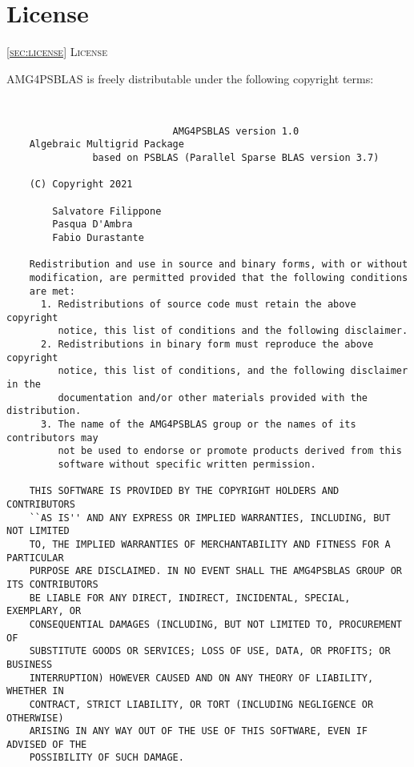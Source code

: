 \section{License\label{sec:license}}
         {\textsc{\ref{sec:license} License}}


AMG4PSBLAS is freely distributable under the following copyright
terms: {\small
\begin{verbatim}
  
   
                             AMG4PSBLAS version 1.0
    Algebraic Multigrid Package
               based on PSBLAS (Parallel Sparse BLAS version 3.7)
    
    (C) Copyright 2021
  
        Salvatore Filippone  
        Pasqua D'Ambra   
        Fabio Durastante        
   
    Redistribution and use in source and binary forms, with or without
    modification, are permitted provided that the following conditions
    are met:
      1. Redistributions of source code must retain the above copyright
         notice, this list of conditions and the following disclaimer.
      2. Redistributions in binary form must reproduce the above copyright
         notice, this list of conditions, and the following disclaimer in the
         documentation and/or other materials provided with the distribution.
      3. The name of the AMG4PSBLAS group or the names of its contributors may
         not be used to endorse or promote products derived from this
         software without specific written permission.
   
    THIS SOFTWARE IS PROVIDED BY THE COPYRIGHT HOLDERS AND CONTRIBUTORS
    ``AS IS'' AND ANY EXPRESS OR IMPLIED WARRANTIES, INCLUDING, BUT NOT LIMITED
    TO, THE IMPLIED WARRANTIES OF MERCHANTABILITY AND FITNESS FOR A PARTICULAR
    PURPOSE ARE DISCLAIMED. IN NO EVENT SHALL THE AMG4PSBLAS GROUP OR ITS CONTRIBUTORS
    BE LIABLE FOR ANY DIRECT, INDIRECT, INCIDENTAL, SPECIAL, EXEMPLARY, OR
    CONSEQUENTIAL DAMAGES (INCLUDING, BUT NOT LIMITED TO, PROCUREMENT OF
    SUBSTITUTE GOODS OR SERVICES; LOSS OF USE, DATA, OR PROFITS; OR BUSINESS
    INTERRUPTION) HOWEVER CAUSED AND ON ANY THEORY OF LIABILITY, WHETHER IN
    CONTRACT, STRICT LIABILITY, OR TORT (INCLUDING NEGLIGENCE OR OTHERWISE)
    ARISING IN ANY WAY OUT OF THE USE OF THIS SOFTWARE, EVEN IF ADVISED OF THE
    POSSIBILITY OF SUCH DAMAGE.

\end{verbatim}
}
